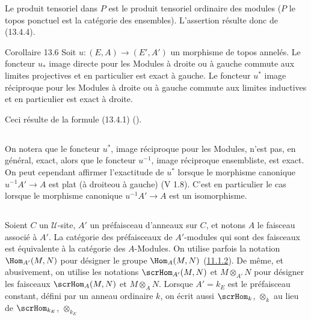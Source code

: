 \documentclass[10pt]{../fichiers-configuration-latex/smfart}
\begin{document}
Le produit tensoriel dans $P$ est le produit tensoriel ordinaire des
modules ($P$ le topos ponctuel est la catégorie des ensembles).
L'assertion résulte donc de (13.4.4).

\begin{enonce*}{Corollaire 13.6}
Soit $u:(E,A)\rightarrow (E',A')$ un morphisme de topos annelés. Le
foncteur $u_{\ast}$ image directe pour les Modules à droite ou à
gauche commute aux limites projectives et en particulier est exact à
gauche. Le foncteur $u^{\ast}$ image réciproque pour les Modules à
droite ou à gauche commute aux limites inductives et en particulier
est exact à droite.
\end{enonce*}

Ceci résulte de la formule (13.4.1) ().

\setcounter{subsection}{6}
\subsection{}
On notera que le foncteur $u^{\ast}$, image réciproque pour les
Modules, n'est pas, en général, exact, alors que le foncteur
$u^{-1}$, image réciproque ensembliste, est exact. On peut cependant
affirmer l'exactitude de $u^{\ast}$ lorsque le morphisme canonique
$u^{-1}A'\rightarrow A$ est plat (à droite\pageoriginale ou à
gauche) (V 1.8). C'est en particulier le cas lorsque le morphisme
canonique $u^{-1}A'\rightarrow A$ est un isomorphisme.

\subsection{}
Soient $C$ un $𝒰$-site, $A'$ un préfaisceau d'anneaux sur
$C$, et notons $A$ le faisceau associé à $A'$. La catégorie des
préfaisceaux de $A'$-modules qui sont des faisceaux est équivalente
à la catégorie des $A$-Modules. On utilise parfois la notation
$\Hom_{A'}(M,N)$ pour désigner le groupe $\Hom_A(M,N)$
(\hyperref[IV.subsubsec11.1.2]{11.1.2}). De même, et abusivement, on utilise les
notations $\scrHom_{A'}(M,N)$ et $M\otimes_{A'}N$ pour désigner les
faisceaux $\scrHom_A(M,N)$ et $M\otimes_A N$. Lorsque $A'=k_E$ est
le préfaisceau constant, défini par un anneau ordinaire $k$, on
écrit aussi $\scrHom_k$, $\otimes_k$ au lieu de $\scrHom_{k_E}$,
$\otimes_{k_E}$
\end{document}
